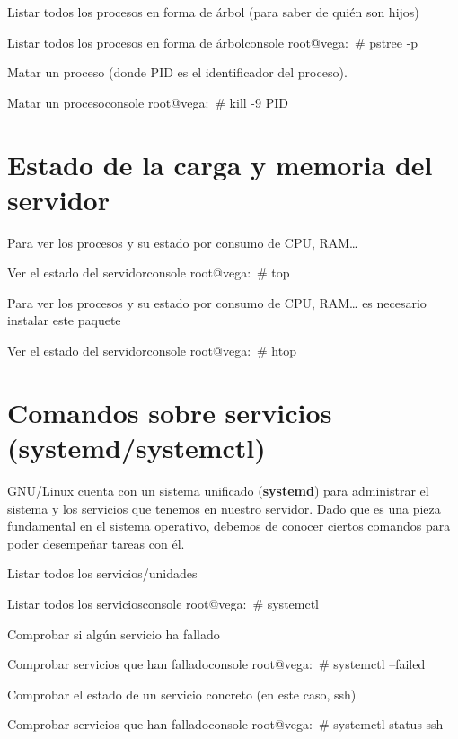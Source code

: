Listar todos los procesos en forma de árbol (para saber de quién son hijos)
\begin{mycode}{Listar todos los procesos en forma de árbol}{console}{}
root@vega:~# pstree -p
\end{mycode}

Matar un proceso (donde PID es el identificador del proceso).
\begin{mycode}{Matar un proceso}{console}{}
root@vega:~# kill -9 PID
\end{mycode}

\section{Estado de la carga y memoria del servidor}
Para ver los procesos y su estado por consumo de CPU, RAM…
\begin{mycode}{Ver el estado del servidor}{console}{}
root@vega:~# top
\end{mycode}

Para ver los procesos y su estado por consumo de CPU, RAM… es necesario instalar este paquete
\begin{mycode}{Ver el estado del servidor}{console}{}
root@vega:~# htop
\end{mycode}

\section{Comandos sobre servicios (systemd/systemctl)}
GNU/Linux cuenta con un sistema unificado (\textbf{systemd}) para administrar el sistema y los servicios que tenemos en nuestro servidor. Dado que es una pieza fundamental en el sistema operativo, debemos de conocer ciertos comandos para poder desempeñar tareas con él.

Listar todos los servicios/unidades
\begin{mycode}{Listar todos los servicios}{console}{}
root@vega:~# systemctl
\end{mycode}

Comprobar si algún servicio ha fallado
\begin{mycode}{Comprobar servicios que han fallado}{console}{}
root@vega:~# systemctl --failed
\end{mycode}

Comprobar el estado de un servicio concreto (en este caso, ssh)
\begin{mycode}{Comprobar servicios que han fallado}{console}{}
root@vega:~# systemctl status ssh
\end{mycode}

